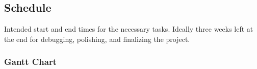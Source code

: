 \subsection{Schedule}
	Intended start and end times for the necessary tasks. Ideally three weeks left at the end for debugging, polishing, and finalizing the project.
	\subsubsection{Gantt Chart}